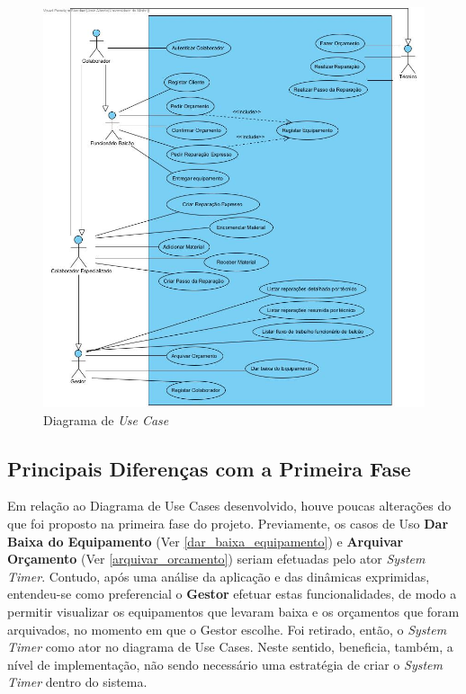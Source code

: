 \documentclass[a4paper,12pt]{scrreprt}
\begin{document}
\begin{figure}[!ht]
    \centering
    \includegraphics[scale=0.45]{dss-usecase.jpg}
    \caption{Diagrama de \textit{Use Case}}
\end{figure}

\subsection{Principais Diferenças com a Primeira Fase}

Em relação ao Diagrama de Use Cases desenvolvido, houve poucas alterações do que foi proposto na primeira fase do projeto.
Previamente, os casos de Uso \textbf{Dar Baixa do Equipamento} (Ver \ref{dar_baixa_equipamento}) e \textbf{Arquivar Orçamento} (Ver \ref{arquivar_orcamento})
seriam efetuadas pelo ator \textit{System Timer}. Contudo, após uma análise da aplicação e das dinâmicas exprimidas, entendeu-se como 
preferencial o \textbf{Gestor} efetuar estas funcionalidades, de modo a permitir visualizar os equipamentos que levaram baixa e os orçamentos que foram arquivados,
no momento em que o Gestor escolhe.
Foi retirado, então, o \textit{System Timer} como ator no diagrama de Use Cases.
Neste sentido, beneficia, também, a nível de implementação, não sendo necessário uma estratégia de criar o \textit{System Timer} dentro do sistema.
\end{document}
